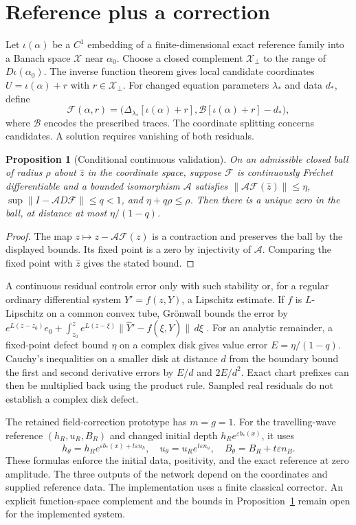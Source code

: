 \documentclass[12pt,a4paper,oneside]{report}
\numberwithin{equation}{chapter}
\newtheorem{proposition}[theorem]{Proposition}
\theoremstyle{remark}\newtheorem{remark}[theorem]{Remark}
\begin{document}
\section{Reference plus a correction}
Let $\iota(\alpha)$ be a $C^1$ embedding of a finite-dimensional exact reference family into a Banach space $\mathcal X$ near $\alpha_0$. Choose a closed complement $\mathcal X_\perp$ to the range of $D\iota(\alpha_0)$. The inverse function theorem gives local candidate coordinates $U=\iota(\alpha)+r$ with $r\in\mathcal X_\perp$. For changed equation parameters $\lambda_*$ and data $d_*$, define
\[
 \mathcal F(\alpha,r)=
 \big(\Delta_{\lambda_*}[\iota(\alpha)+r],          \mathcal B[\iota(\alpha)+r]-d_*\big),
\]
where $\mathcal B$ encodes the prescribed traces. The coordinate splitting concerns candidates. A solution requires vanishing of both residuals.

\begin{proposition}[Conditional continuous validation]\label{prop:validate}
On an admissible closed ball of radius $\rho$ about $\widehat z$ in the coordinate space, suppose $\mathcal F$ is continuously Fr\'echet differentiable and a bounded isomorphism $\mathcal A$ satisfies
$\|\mathcal A\mathcal F(\widehat z)\|\le\eta$,
$\sup\|I-\mathcal A D\mathcal F\|\le q<1$, and $\eta+q\rho\le\rho$.
Then there is a unique zero in the ball, at distance at most $\eta/(1-q)$.
\end{proposition}
\begin{proof}
The map $z\mapsto z-\mathcal A\mathcal F(z)$ is a contraction and preserves the ball by the displayed bounds. Its fixed point is a zero by injectivity of $\mathcal A$. Comparing the fixed point with $\widehat z$ gives the stated bound.
\end{proof}
A continuous residual controls error only with such stability or, for a regular ordinary differential system $Y'=f(z,Y)$, a Lipschitz estimate. If $f$ is $L$-Lipschitz on a common convex tube, Gr\"onwall bounds the error by
$e^{L(z-z_0)}e_0+\int_{z_0}^z e^{L(z-\xi)}\|\widehat Y'-f(\xi,\widehat Y)\|\,d\xi$ \cite{teschl2012,mishra2023}.
For an analytic remainder, a fixed-point defect bound $\eta$ on a complex disk gives value error $E=\eta/(1-q)$. Cauchy's inequalities on a smaller disk at distance $d$ from the boundary bound the first and second derivative errors by $E/d$ and $2E/d^2$. Exact chart prefixes can then be multiplied back using the product rule. Sampled real residuals do not establish a complex disk defect.

The retained field-correction prototype has $m=g=1$. For the travelling-wave reference $(h_R,u_R,B_R)$ and changed initial depth $h_R e^{\varepsilon b_*(x)}$, it uses
\[
 h_\theta=h_R e^{\varepsilon b_*(x)+t\varepsilon n_h},\quad
 u_\theta=u_R e^{t\varepsilon n_u},\quad B_\theta=B_R+t\varepsilon n_B .
\]
These formulas enforce the initial data, positivity, and the exact reference at zero amplitude. The three outputs of the network depend on the coordinates and supplied reference data. The implementation uses a finite classical corrector. An explicit function-space complement and the bounds in Proposition~\ref{prop:validate} remain open for the implemented system.
\end{document}
